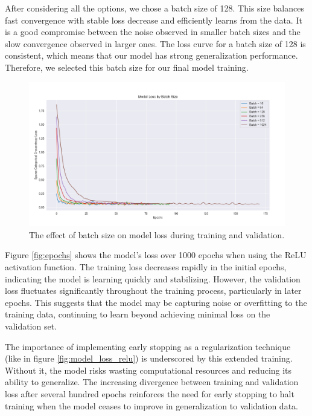After considering all the options, we chose a batch size of 128. This size balances fast convergence with stable loss decrease and efficiently learns from the data. It is a good compromise between the noise observed in smaller batch sizes and the slow convergence observed in larger ones. The loss curve for a batch size of 128 is consistent, which means that our model has strong generalization performance. Therefore, we selected this batch size for our final model training.

\begin{figure}[ht!]
	\centering
	\includegraphics[width=\textwidth]{images/batch_sizes_comparison.png}
	\caption{The effect of batch size on model loss during training and validation.}
	\label{fig:batch_sizes}
\end{figure}

Figure \ref{fig:epochs} shows the model's loss over 1000 epochs when using the ReLU activation function. The training loss decreases rapidly in the initial epochs, indicating the model is learning quickly and stabilizing. However, the validation loss fluctuates significantly throughout the training process, particularly in later epochs. This suggests that the model may be capturing noise or overfitting to the training data, continuing to learn beyond achieving minimal loss on the validation set.

The importance of implementing early stopping as a regularization technique (like in figure \ref{fig:model_loss_relu}) is underscored by this extended training. Without it, the model risks wasting computational resources and reducing its ability to generalize. The increasing divergence between training and validation loss after several hundred epochs reinforces the need for early stopping to halt training when the model ceases to improve in generalization to validation data.

